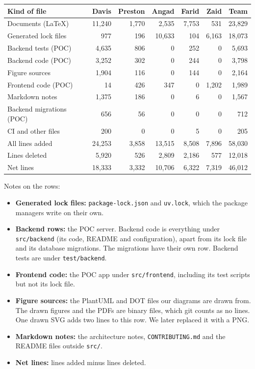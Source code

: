 \documentclass{article}
\begin{document}
\begin{table}[H]
\centering
\small
\setlength{\tabcolsep}{3pt}
\begin{tabular}{lrrrrrr}
\toprule
\textbf{Kind of file} & \textbf{Davis} & \textbf{Preston} & \textbf{Angad} &
\textbf{Farid} & \textbf{Zaid} & \textbf{Team}\\
\midrule
Documents (\LaTeX{}) & 11,240 & 1,770 & 2,535 & 7,753 & 531 & 23,829\\
Generated lock files & 977 & 196 & 10,633 & 104 & 6,163 & 18,073\\
Backend tests (POC) & 4,635 & 806 & 0 & 252 & 0 & 5,693\\
Backend code (POC) & 3,252 & 302 & 0 & 244 & 0 & 3,798\\
Figure sources & 1,904 & 116 & 0 & 144 & 0 & 2,164\\
Frontend code (POC) & 14 & 426 & 347 & 0 & 1,202 & 1,989\\
Markdown notes & 1,375 & 186 & 0 & 6 & 0 & 1,567\\
Backend migrations (POC) & 656 & 56 & 0 & 0 & 0 & 712\\
CI and other files & 200 & 0 & 0 & 5 & 0 & 205\\
\midrule
All lines added & 24,253 & 3,858 & 13,515 & 8,508 & 7,896 & 58,030\\
Lines deleted & 5,920 & 526 & 2,809 & 2,186 & 577 & 12,018\\
Net lines & 18,333 & 3,332 & 10,706 & 6,322 & 7,319 & 46,012\\
\bottomrule
\end{tabular}
\end{table}

Notes on the rows:

\begin{itemize}
\setlength{\itemsep}{0pt}
\item \textbf{Generated lock files:} \texttt{package-lock.json} and
  \texttt{uv.lock}, which the package managers write on their own.
\item \textbf{Backend rows:} the POC server. Backend code is everything under
  \texttt{src/backend} (its code, README and configuration), apart from its
  lock file and its database migrations. The migrations have their own row.
  Backend tests are under \texttt{test/backend}.
\item \textbf{Frontend code:} the POC app under \texttt{src/frontend},
  including its test scripts but not its lock file.
\item \textbf{Figure sources:} the PlantUML and DOT files our diagrams are
  drawn from. The drawn figures and the PDFs are binary files, which git
  counts as no lines. One drawn SVG adds two lines to this row. We later
  replaced it with a PNG.
\item \textbf{Markdown notes:} the architecture notes, \texttt{CONTRIBUTING.md}
  and the README files outside \texttt{src/}.
\item \textbf{Net lines:} lines added minus lines deleted.
\end{itemize}
\end{document}
